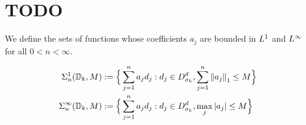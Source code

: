 











\section{TODO}

We define the sets of functions whose coefficients $a_j$ are bounded in $L^{1}$
and $L^{\infty}$ for all $0 < n < \infty$.

\begin{align*}
    \Sigma_n^1(\mathbb{D}_k, M) &:= \Big\{
        \sum_{j=1}^n a_j d_j:
        d_j \in D^d_{\sigma_k}, \sum_{j=1}^n \left\| a_j \right\|_1 \leq M 
    \Big\} \\
    \Sigma_n^{\infty}(\mathbb{D}_k, M) &:= \Big\{
        \sum_{j=1}^n a_j d_j:
        d_j \in D^d_{\sigma_k}, \max_{j} \left| a_j \right| \leq M 
    \Big\}
\end{align*}


